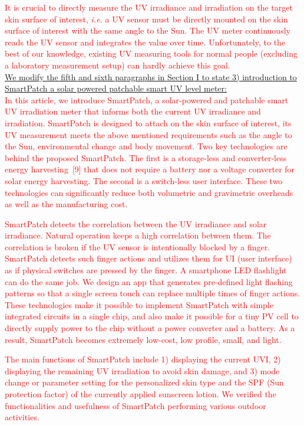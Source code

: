 \documentclass[onecolumn]{IEEEconf}
\begin{document}
\begin{description}
\textcolor{red}{It is crucial to directly measure the UV irradiance and irradiation on the target skin surface of interest, \textit{i.e.} a UV sensor must be directly mounted on the skin surface of interest with the same angle to the Sun. The UV meter continuously reads the UV sensor and integrates the value over time. Unfortunately, to the best of our knowledge, existing UV measuring tools for normal people (excluding a laboratory measurement setup) can hardly achieve this goal.}\\

\uline{We modify the fifth and sixth paragraphs in Section I to state 3) introduction to SmartPatch a solar powered patchable smart UV level meter:}\\
%
\textcolor{red}{In this article, we introduce SmartPatch, a solar-powered and patchable smart UV irradiation meter that informs both the current UV irradiance and irradiation. SmartPatch is designed to attach on the skin surface of interest, its UV measurement meets the above mentioned requirements such as the angle to the Sun, environmental change and body movement. Two key technologies are behind the proposed SmartPatch. The first is a storage-less and converter-less energy harvesting~[9] that does not require a battery nor a voltage converter for solar energy harvesting. The second is a switch-less user interface. These two technologies can significantly reduce both volumetric and gravimetric overheads as well as the manufacturing cost.}

\textcolor{red}{SmartPatch detects the correlation between the UV irradiance and solar irradiance. Natural operation keeps a high correlation between them. The correlation is broken if the UV sensor is intentionally blocked by a finger. SmartPatch detects such finger actions and utilizes them for UI (user interface) as if physical switches are pressed by the finger. A smartphone LED flashlight can do the same job. We design an app that  generates pre-defined light flashing patterns so that a single screen touch can replace multiple times of finger actions. These technologies make it possible to implement SmartPatch with simple integrated circuits in a single chip, and also make it possible for a tiny PV cell to directly supply power to the chip without a power converter and a battery. As a result, SmartPatch becomes extremely low-cost, low profile, small, and light.}

 \textcolor{red}{The main functions of SmartPatch include 1) displaying the current UVI, 2) displaying the remaining UV irradiation to avoid skin damage, and 3) mode change or parameter setting for the personalized skin type and the SPF (Sun protection factor) of the currently applied sunscreen lotion. We verified the functionalities and usefulness of SmartPatch performing various outdoor activities.}\\


\end{description}
\end{document}

